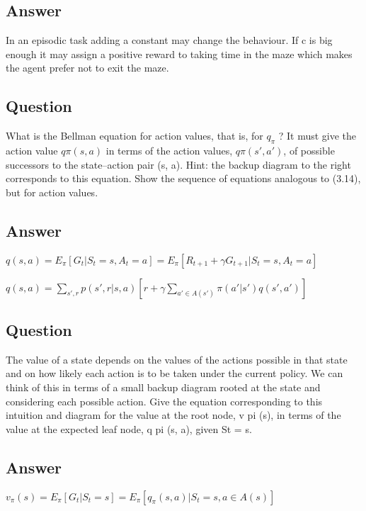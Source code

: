 \documentclass[11pt]{article}
\begin{document}
    \subsection*{Answer}

    In an episodic task adding a constant may change the behaviour.
    If c is big enough it may assign a positive reward to taking time in the maze which makes the agent prefer not to exit the maze.

    \subsection{Question}

    What is the Bellman equation for action values, that is, for $q_\pi$ ?
    It must give the action value $q\pi(s, a)$ in terms of the action values, $q\pi(s', a')$, of possible successors to the state–action pair (s, a).
    Hint: the backup diagram to the right corresponds to this equation.
    Show the sequence of equations analogous to (3.14), but for action values.

    \subsection*{Answer}

    $q(s, a) =  E_{\pi}[G_{t}|S_{t}=s, A_{t}=a] = E_{\pi}[R_{t+1} + \gamma G_{t+1}|S_{t}=s, A_{t}=a]$

    $q(s, a) =  \sum_{s',r} p(s',r | s, a) [r + \gamma \sum_{a' \in A(s')} \pi(a'|s')q(s', a') ] $

    \subsection{Question}

    The value of a state depends on the values of the actions possible in that state and on how likely each action is to be taken under the current policy.
    We can think of this in terms of a small backup diagram rooted at the state and considering each possible action.
    Give the equation corresponding to this intuition and diagram for the value at the root node, v pi (s), in terms of the value at the expected leaf node, q pi (s, a), given St = s.

    \subsection*{Answer}

    $v_{\pi}(s) = E_{\pi}[G_{t}|S_{t}=s] = E_{\pi}[q_{\pi}(s,a)|S_{t}=s, a \in A(s)] $
\end{document}
